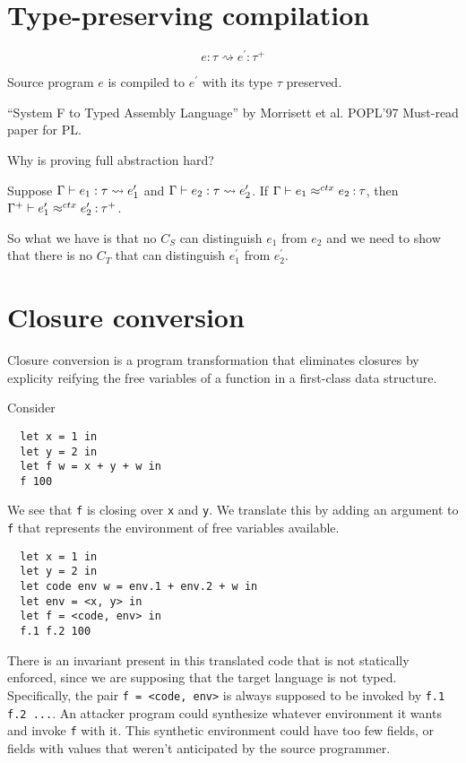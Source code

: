 \documentclass[11pt]{article}
\newcommand{\code}{\texttt}
\newcommand{\compile}{\rightsquigarrow}
\newcommand{\ctxeq}{\approx^{ctx}}
\begin{document}
\section{Type-preserving compilation}

\[
\boxed{e : \tau \compile e^\prime : \tau^+}
\]

Source program $e$ is compiled to $e^\prime$ with its type $\tau$ preserved.

``System F to Typed Assembly Language'' by Morrisett et al. POPL'97
Must-read paper for PL.

Why is proving full abstraction hard?

\begin{thm}
  Suppose $\Gamma \proves e_1 : \tau \compile e_1^\prime$
  and $\Gamma \proves e_2 : \tau \compile e_2^\prime$.
  If $\Gamma \proves e_1 \ctxeq e_2 \oft \tau$,
  then $\Gamma^+ \proves e_1^\prime \ctxeq e_2^\prime \oft \tau^+$.
\end{thm}

So what we have is that no $C_S$ can distinguish $e_1$ from $e_2$ and we need to
show that there is no $C_T$ that can distinguish $e_1^\prime$ from $e_2^\prime$.

\section{Closure conversion}

Closure conversion is a program transformation that eliminates closures by
explicity reifying the free variables of a function in a first-class data
structure.

Consider
\begin{lstlisting}
  let x = 1 in
  let y = 2 in
  let f w = x + y + w in
  f 100
\end{lstlisting}

We see that \code{f} is closing over \code{x} and \code{y}.
We translate this by adding an argument to \code{f} that represents the
environment of free variables available.
  
\begin{lstlisting}
  let x = 1 in
  let y = 2 in
  let code env w = env.1 + env.2 + w in
  let env = <x, y> in
  let f = <code, env> in
  f.1 f.2 100
\end{lstlisting}

There is an invariant present in this translated code that is not statically
enforced, since we are supposing that the target language is not
typed. Specifically, the pair \code{f = <code, env>} is always supposed to be
invoked by \code{f.1 f.2 ...}. An attacker program could synthesize whatever
environment it wants and invoke \code{f} with it. This synthetic environment
could have too few fields, or fields with values that weren't anticipated by the
source programmer.
\end{document}
